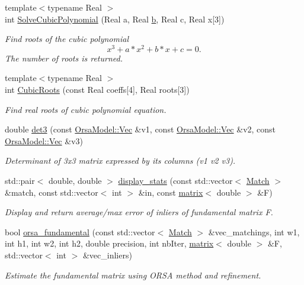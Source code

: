 \begin{DoxyCompactItemize}
\item 
{\footnotesize template$<$typename Real $>$ }\\int \hyperlink{namespaceorsa_ab41ebe58722491aaa1434a268031f362}{Solve\+Cubic\+Polynomial} (Real a, Real \hyperlink{jpegint_8h_af320905358fa78701e4cc60b6135601f}{b}, Real c, Real x\mbox{[}3\mbox{]})
\begin{DoxyCompactList}\small\item\em Find roots of the cubic polynomial \[ x^3 + a*x^2 + b*x + c = 0. \] The number of roots is returned. \end{DoxyCompactList}\item 
{\footnotesize template$<$typename Real $>$ }\\int \hyperlink{namespaceorsa_a50375d8484f681825ff22e6f5a65ca74}{Cubic\+Roots} (const Real coeffs\mbox{[}4\mbox{]}, Real roots\mbox{[}3\mbox{]})
\begin{DoxyCompactList}\small\item\em Find real roots of cubic polynomial equation. \end{DoxyCompactList}\item 
double \hyperlink{namespaceorsa_a108794b95a065355756c616b8e389614}{det3} (const \hyperlink{classorsa_1_1OrsaModel_a3e690ba72d88880cc9d7074350c09104}{Orsa\+Model\+::\+Vec} \&v1, const \hyperlink{classorsa_1_1OrsaModel_a3e690ba72d88880cc9d7074350c09104}{Orsa\+Model\+::\+Vec} \&v2, const \hyperlink{classorsa_1_1OrsaModel_a3e690ba72d88880cc9d7074350c09104}{Orsa\+Model\+::\+Vec} \&v3)
\begin{DoxyCompactList}\small\item\em Determinant of 3x3 matrix expressed by its columns (v1 v2 v3). \end{DoxyCompactList}\item 
std\+::pair$<$ double, double $>$ \hyperlink{namespaceorsa_a549d3d8f819944dabf30b57ed2f06460}{display\+\_\+stats} (const std\+::vector$<$ \hyperlink{structMatch}{Match} $>$ \&match, const std\+::vector$<$ int $>$ \&in, const \hyperlink{classlibNumerics_1_1matrix}{matrix}$<$ double $>$ \&F)
\begin{DoxyCompactList}\small\item\em Display and return average/max error of inliers of fundamental matrix F. \end{DoxyCompactList}\item 
bool \hyperlink{namespaceorsa_a64e49fabb585ae5ef2e5f9c6a40ac8d9}{orsa\+\_\+fundamental} (const std\+::vector$<$ \hyperlink{structMatch}{Match} $>$ \&vec\+\_\+matchings, int w1, int h1, int w2, int h2, double precision, int nb\+Iter, \hyperlink{classlibNumerics_1_1matrix}{matrix}$<$ double $>$ \&F, std\+::vector$<$ int $>$ \&vec\+\_\+inliers)
\begin{DoxyCompactList}\small\item\em Estimate the fundamental matrix using O\+R\+S\+A method and refinement. \end{DoxyCompactList}\end{DoxyCompactItemize}


